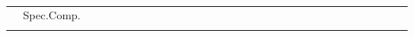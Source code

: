 \begin{landscape}
\begin{table*}
\begin{tabular}{|c|l|c|c|c|c|c|c|c|c|c|c|c|c|c|c|c|c|c|c|c|c|c|c|c|c|c|c|c|c|c|}
 & Spec.Comp.     & & & & & & & & & & & & & & & & & & & & & & & & & & & & & \\ \Xhline{2\arrayrulewidth}


\end{tabular}
\caption{
}
\label{table:cmp-mms}
\end{table*}

\end{landscape}

\twocolumn
